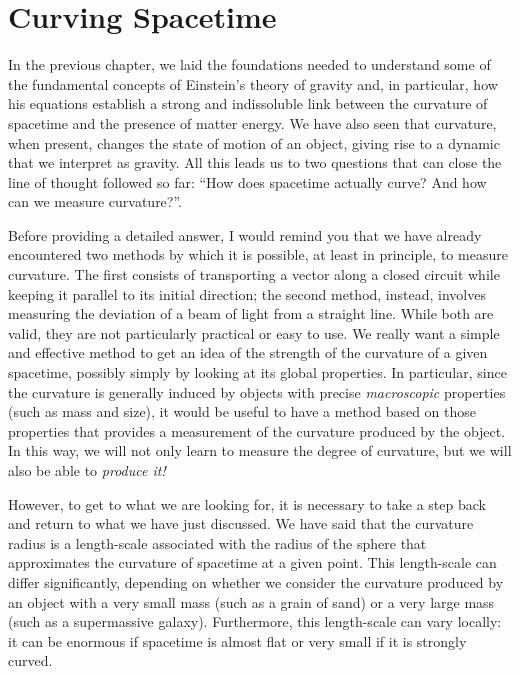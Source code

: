\chapter{Curving Spacetime}\label{ch:04}

In the previous chapter, we laid the foundations needed to understand some of the
fundamental concepts of Einstein's theory of gravity and, in particular, how his
equations establish a strong and indissoluble link between the curvature of spacetime
and the presence of matter energy. We have also seen that curvature, when present,
changes the state of motion of an object, giving rise to a dynamic that we interpret as
gravity. All this leads us to two questions that can close the line of thought followed
so far: ``How does spacetime actually curve? And how can we measure curvature?''.

Before providing a detailed answer, I would remind you that we have already encountered
two methods by which it is possible, at least in principle, to measure curvature. The
first consists of transporting a vector along a closed circuit while
keeping it parallel to its initial direction; the second method, instead, involves
measuring the deviation of a beam of light from a straight line. While both are valid,
they are not particularly practical or easy to use. We really want a simple and
effective method to get an idea of the strength of the curvature of a given spacetime,
possibly simply by looking at its global properties. In particular, since the curvature
is generally induced by objects with precise \emph{macroscopic} properties (such as mass
and size), it would be useful to have a method based on those properties that provides a
measurement of the curvature produced by the object. In this way, we will not only learn
to measure the degree of curvature, but we will also be able to \emph{produce it!}

However, to get to what we are looking for, it is necessary to take a step back and
return to what we have just discussed. We have said that the curvature radius is a
length-scale associated with the radius of the sphere that approximates the curvature of
spacetime at a given point. This length-scale can differ significantly, depending on
whether we consider the curvature produced by an object with a very small mass (such as
a grain of sand) or a very large mass (such as a supermassive galaxy). Furthermore, this
length-scale can vary locally: it can be enormous if spacetime is almost flat or very
small if it is strongly curved.


